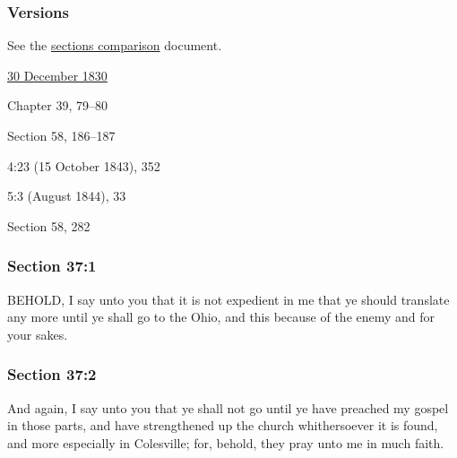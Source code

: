 	\subsubsection{Versions}
		\label{DC37-V}
		
		See the \href{https://drive.google.com/file/d/1goAvNz8jS4R8slYfMG_db55Ty2z_vmgK/view?usp=sharing}{sections comparison} document.
	
		\begin{compactdesc}
			\item[JSP] \hyperref[EMS-1830-JS-30-DEC-1830]{30 December 1830}
			\item[BC] Chapter 39, 79--80
			\item[DC 1835] Section 58, 186--187
			\item[TS] 4:23 (15 October 1843), 352
			\item[MS] 5:3 (August 1844), 33
			\item[DC 1844] Section 58, 282
		\end{compactdesc}

	\subsubsection{Section 37:1} %
		\label{DC37-1}

		BEHOLD, I say unto you that it is not expedient in me that ye should translate any more until ye shall go to the Ohio, and this because of the enemy and for your sakes.


	\subsubsection{Section 37:2} %
		\label{DC37-2}

		And again, I say unto you that ye shall not go until ye have preached my gospel in those parts, and have strengthened up the church whithersoever it is found, and more especially in Colesville; for, behold, they pray unto me in much faith.

